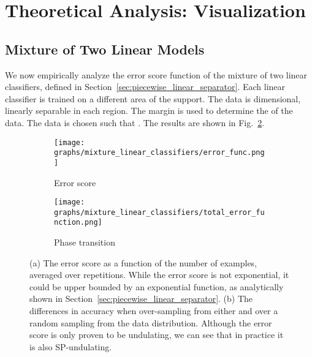 \documentclass{article}
\begin{document}
\section{Theoretical Analysis: Visualization}







\subsection{Mixture of Two Linear Models}


We now empirically analyze the error score function of the mixture of two linear classifiers, defined in Section~\ref{sec:piecewise_linear_separator}. Each linear classifier is trained on a different area of the support. The data is  dimensional, linearly separable in each region. The margin is used to determine the  of the data. The data is chosen such that . The results are shown in Fig.~\ref{fig:error_linear_classifier_mixture}.

\begin{figure}[thb!]
    \begin{subfigure}{.23\textwidth}
      \centering
        \texttt{[image: graphs/mixture\_linear\_classifiers/error\_func.png]}
        \caption{Error score}
\end{subfigure}
    \begin{subfigure}{.23\textwidth}
      \centering
        \texttt{[image: graphs/mixture\_linear\_classifiers/total\_error\_function.png]}
        \caption{Phase transition}
      \label{subfig:error_linear_classifier_mixture_b}
    \end{subfigure}
\caption{(a) The error score  as a function of the number of examples, averaged over  repetitions. While the error score is not exponential, it could be upper bounded by an exponential function, as analytically shown in Section~\ref{sec:piecewise_linear_separator}. (b) The differences in accuracy when over-sampling from either  and  over a random sampling from the data distribution. Although the error score is only proven to be undulating, we can see that in practice it is also SP-undulating.}
\label{fig:error_linear_classifier_mixture}
\end{figure}
\end{document}

